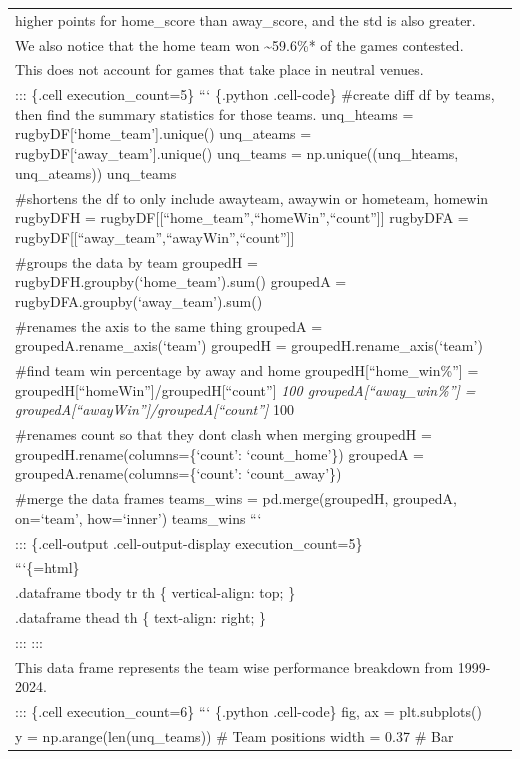 \documentclass[
  letterpaper,
  DIV=11,
  numbers=noendperiod]{scrartcl}
\begin{document}
\begin{longtable}[]{@{}
  >{\raggedright\arraybackslash}p{}@{}}
higher points for home\_score than away\_score, and the std is also
greater. \\
We also notice that the home team won \textasciitilde59.6\%* of the
games contested. \\
*This does not account for games that take place in neutral venues. \\
::: \{.cell execution\_count=5\} ``` \{.python .cell-code\} \#create
diff df by teams, then find the summary statistics for those teams.
unq\_hteams = rugbyDF{[}`home\_team'{]}.unique() unq\_ateams =
rugbyDF{[}`away\_team'{]}.unique() unq\_teams = np.unique((unq\_hteams,
unq\_ateams)) unq\_teams \\
\#shortens the df to only include awayteam, awaywin or hometeam, homewin
rugbyDFH = rugbyDF{[}{[}``home\_team'',``homeWin'',``count''{]}{]}
rugbyDFA = rugbyDF{[}{[}``away\_team'',``awayWin'',``count''{]}{]} \\
\#groups the data by team groupedH =
rugbyDFH.groupby(`home\_team').sum() groupedA =
rugbyDFA.groupby(`away\_team').sum() \\
\#renames the axis to the same thing groupedA =
groupedA.rename\_axis(`team') groupedH =
groupedH.rename\_axis(`team') \\
\#find team win percentage by away and home
groupedH{[}``home\_win\%''{]} =
groupedH{[}``homeWin''{]}/groupedH{[}``count''{]} \emph{100
groupedA{[}``away\_win\%''{]} =
groupedA{[}``awayWin''{]}/groupedA{[}``count''{]} }100 \\
\#renames count so that they dont clash when merging groupedH =
groupedH.rename(columns=\{`count': `count\_home'\}) groupedA =
groupedA.rename(columns=\{`count': `count\_away'\}) \\
\#merge the data frames teams\_wins = pd.merge(groupedH, groupedA,
on=`team', how=`inner') teams\_wins ``` \\
::: \{.cell-output .cell-output-display execution\_count=5\} \\
```\{=html\} \\
.dataframe tbody tr th \{ vertical-align: top; \} \\
.dataframe thead th \{ text-align: right; \} \\
::: ::: \\
This data frame represents the team wise performance breakdown from
1999-2024. \\
::: \{.cell execution\_count=6\} ``` \{.python .cell-code\} fig, ax =
plt.subplots() \\
y = np.arange(len(unq\_teams)) \# Team positions width = 0.37 \# Bar

\end{longtable}
\end{document}
